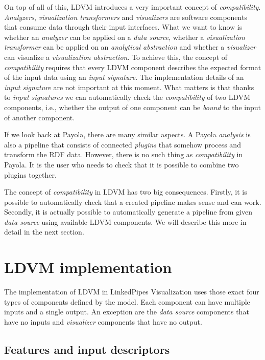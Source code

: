 On top of all of this, LDVM introduces a very important concept of \emph{compatibility}. \emph{Analyzers}, \emph{visualization transformers} and \emph{visualizers} are software components that consume data through their input interfaces. What we want to know is whether an \emph{analyzer} can be applied on a \emph{data source}, whether a \emph{visualization transformer} can be applied on an \emph{analytical abstraction} and whether a \emph{visualizer} can visualize a \emph{visualization abstraction}. To achieve this, the concept of \emph{compatibility} requires that every LDVM component describes the expected format of the input data using an \emph{input signature}. The implementation details of an \emph{input signature} are not important at this moment. What matters is that thanks to \emph{input signatures} we can automatically check the \emph{compatibility} of two LDVM components, i.e., whether the output of one component can be \emph{bound} to the input of another component.

If we look back at Payola, there are many similar aspects. A Payola \emph{analysis} is also a pipeline that consists of connected \emph{plugins} that somehow process and transform the RDF data. However, there is no such thing as \emph{compatibility} in Payola. It is the user who needs to check that it is possible to combine two plugins together.

The concept of \emph{compatibility} in LDVM has two big consequences. Firstly, it is possible to automatically check that a created pipeline makes sense and can work. Secondly, it is actually possible to automatically generate a pipeline from given \emph{data source} using available LDVM components. We will describe this more in detail in the next section.

\section{LDVM implementation}
\label{sec:linkedpipes:ldvm-implementation}

The implementation of LDVM in LinkedPipes Visualization \cite{ldvm_use_cases} uses those exact four types of components defined by the model. Each component can have multiple inputs and a single output. An exception are the \emph{data source} components that have no inputs and \emph{visualizer} components that have no output. 

\subsection{Features and input descriptors}


